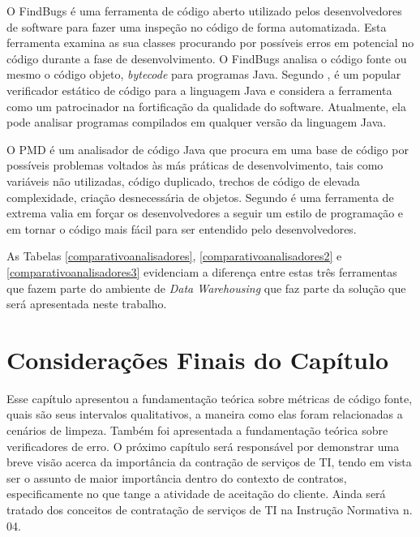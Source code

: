 O FindBugs é uma ferramenta de código aberto utilizado pelos desenvolvedores de software para fazer uma  inspeção no código de forma automatizada. Esta ferramenta examina as sua classes procurando por possíveis erros em potencial no código durante a fase de desenvolvimento. O FindBugs analisa o código fonte ou mesmo o código objeto, \textit{bytecode} para programas Java. Segundo , é um popular verificador estático de código para a linguagem Java e considera a ferramenta como um patrocinador na fortificação da qualidade do software. Atualmente, ela pode analisar programas compilados em qualquer versão da linguagem Java.


O PMD é um analisador de código Java que procura em uma base de código por possíveis problemas voltados às más práticas de desenvolvimento, tais como variáveis não utilizadas, código duplicado, trechos de código de elevada complexidade, criação desnecessária de objetos. Segundo \cite{Hovemeyer2004} é uma ferramenta de extrema valia em forçar os desenvolvedores a seguir um estilo de programação e em tornar o código mais fácil para ser entendido pelo desenvolvedores.


As Tabelas \ref{comparativoanalisadores}, \ref{comparativoanalisadores2} e \ref{comparativoanalisadores3} evidenciam a diferença entre estas três ferramentas que fazem parte do ambiente de \textit{Data Warehousing} que faz parte da solução que será apresentada neste trabalho.
 

\begin{table}[H]

\end{table}
\FloatBarrier

\begin{table}[H]

\end{table}
\FloatBarrier


\begin{table}[H]

\end{table}
\FloatBarrier


\section{Considerações Finais do Capítulo}  

Esse capítulo apresentou a fundamentação teórica sobre métricas de código fonte, quais são seus intervalos qualitativos, a maneira como elas foram relacionadas a cenários de limpeza. Também foi apresentada a fundamentação teórica sobre verificadores de erro. O próximo capítulo será responsável por demonstrar uma breve visão acerca da importância da contração de serviços de TI, tendo em vista ser o assunto de maior importância dentro do contexto de contratos, especificamente no que tange a atividade de aceitação do cliente. Ainda será tratado dos conceitos de contratação de serviços de TI na Instrução Normativa n. 04.
